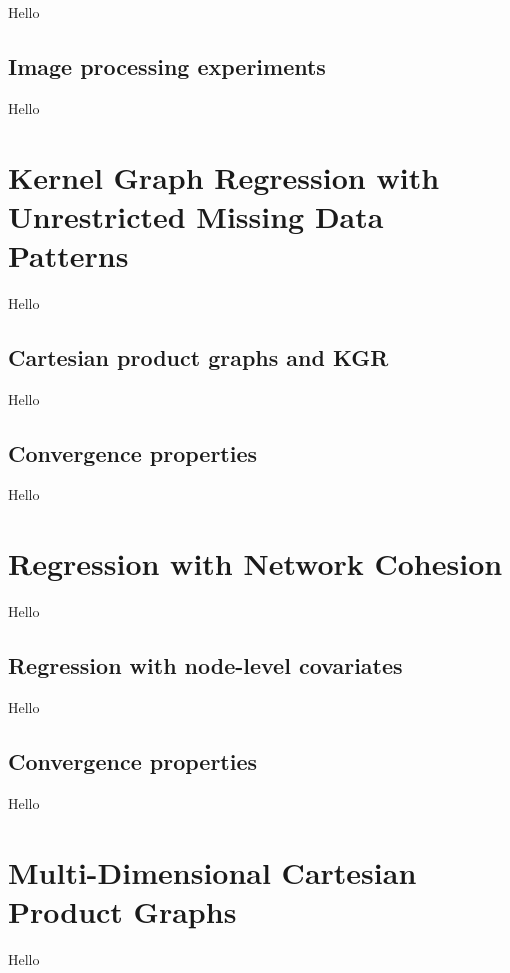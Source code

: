 Hello

\subsection{Image processing experiments}

Hello



\section{Kernel Graph Regression with Unrestricted Missing Data Patterns}

\label{sec:kgr_mdp}

Hello

\subsection{Cartesian product graphs and KGR}

Hello

\subsection{Convergence properties}

Hello


\section{Regression with Network Cohesion}

\label{sec:rnc_mdp}

Hello

\subsection{Regression with node-level covariates}

Hello

\subsection{Convergence properties}

Hello


\section{Multi-Dimensional Cartesian Product Graphs}

\label{sec:nd_gsp}

Hello


